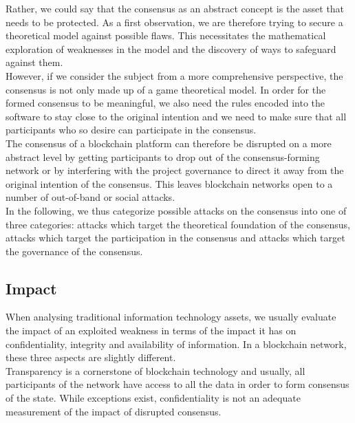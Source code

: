 \documentclass[11pt,a4paper,draft]{article}
\begin{document}
Rather, we could say that the consensus as an abstract concept is the asset that needs to be protected. As a first observation, we are therefore trying to secure a theoretical model against possible flaws. This necessitates the mathematical exploration of weaknesses in the model and the discovery of ways to safeguard against them.\\

However, if we consider the subject from a more comprehensive perspective, the consensus is not only made up of a game theoretical model. In order for the formed consensus to be meaningful, we also need the rules encoded into the software to stay close to the original intention and we need to make sure that all participants who so desire can participate in the consensus.\\

The consensus of a blockchain platform can therefore be disrupted on a more abstract level by getting participants to drop out of the consensus-forming network or by interfering with the project governance to direct it away from the original intention of the consensus. This leaves blockchain networks open to a number of out-of-band or social attacks.\\

In the following, we thus categorize possible attacks on the consensus into one of three categories: attacks which target the theoretical foundation of the consensus, attacks which target the participation in the consensus and attacks which target the governance of the consensus.\\

\subsection{Impact}

When analysing traditional information technology assets, we usually evaluate the impact of an exploited weakness in terms of the impact it has on confidentiality, integrity and availability of information. In a blockchain network, these three aspects are slightly different.\\

Transparency is a cornerstone of blockchain technology and usually, all participants of the network have access to all the data in order to form consensus of the state. While exceptions exist, confidentiality is not an adequate measurement of the impact of disrupted consensus.\\
\end{document}
